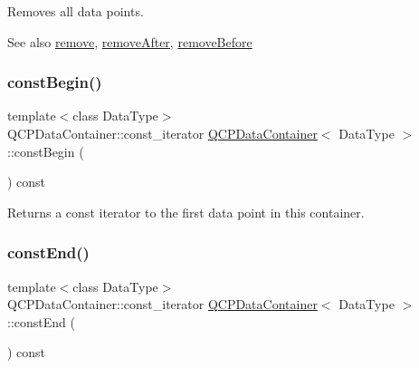 Removes all data points.

\begin{DoxySeeAlso}{See also}
\mbox{\hyperlink{class_q_c_p_data_container_ae5f569a120648b167efa78835f12fd38}{remove}}, \mbox{\hyperlink{class_q_c_p_data_container_abbe5d87ffc10b5aeffa5bb42cf03aa3c}{remove\+After}}, \mbox{\hyperlink{class_q_c_p_data_container_aa7f74cbce304b0369e1626c3798e1eda}{remove\+Before}} 
\end{DoxySeeAlso}
\mbox{\label{class_q_c_p_data_container_a49d7622999e2de67fa2331626a3159aa}} 
\subsubsection{\texorpdfstring{const\+Begin()}{constBegin()}}
{\footnotesize\ttfamily template$<$class Data\+Type$>$ \\
Q\+C\+P\+Data\+Container\+::const\+\_\+iterator \mbox{\hyperlink{class_q_c_p_data_container}{Q\+C\+P\+Data\+Container}}$<$ Data\+Type $>$\+::const\+Begin (\begin{DoxyParamCaption}{ }\end{DoxyParamCaption}) const\hspace{0.3cm}{\ttfamily [inline]}}

Returns a const iterator to the first data point in this container. \mbox{\label{class_q_c_p_data_container_aa7f7cf239b85b1a28de3d675cc5b3da1}} 
\subsubsection{\texorpdfstring{const\+End()}{constEnd()}}
{\footnotesize\ttfamily template$<$class Data\+Type$>$ \\
Q\+C\+P\+Data\+Container\+::const\+\_\+iterator \mbox{\hyperlink{class_q_c_p_data_container}{Q\+C\+P\+Data\+Container}}$<$ Data\+Type $>$\+::const\+End (\begin{DoxyParamCaption}{ }\end{DoxyParamCaption}) const\hspace{0.3cm}{\ttfamily [inline]}}

